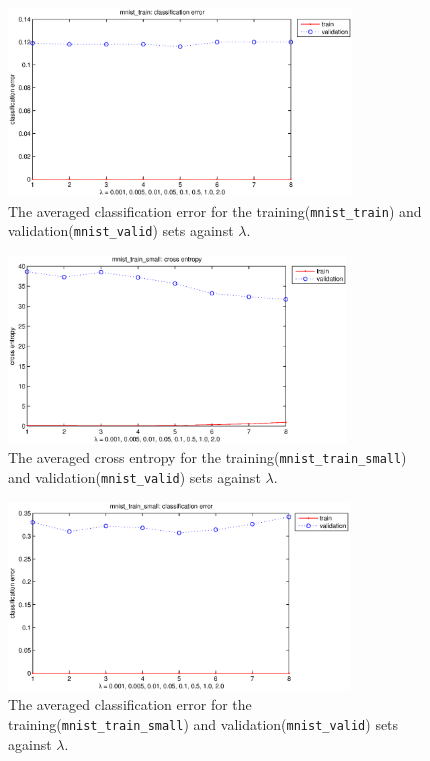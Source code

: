 \documentclass{article}
\begin{document}
\begin{figure}[H]
\centering
\includegraphics[width=\textwidth,height=5cm]{2-3-train-error.eps}
\caption{The averaged classification error for the training(\texttt{mnist\_train}) and validation(\texttt{mnist\_valid}) sets against $\lambda$.
\label{fig:2-3-train-er}}
\end{figure}

\begin{figure}[H]
\centering
\includegraphics[width=\textwidth,height=5cm]{2-3-train-s-ce.eps}
\caption{The averaged cross entropy for the training(\texttt{mnist\_train\_small}) and validation(\texttt{mnist\_valid}) sets against $\lambda$.
\label{fig:2-3-train-s-ce}}
\end{figure}

\begin{figure}[H]
\centering
\includegraphics[width=\textwidth,height=5cm]{2-3-train-s-error.eps}
\caption{The averaged classification error for the training(\texttt{mnist\_train\_small}) and validation(\texttt{mnist\_valid}) sets against $\lambda$.
\label{fig:2-3-train-s-er}}
\end{figure}
\end{document}
